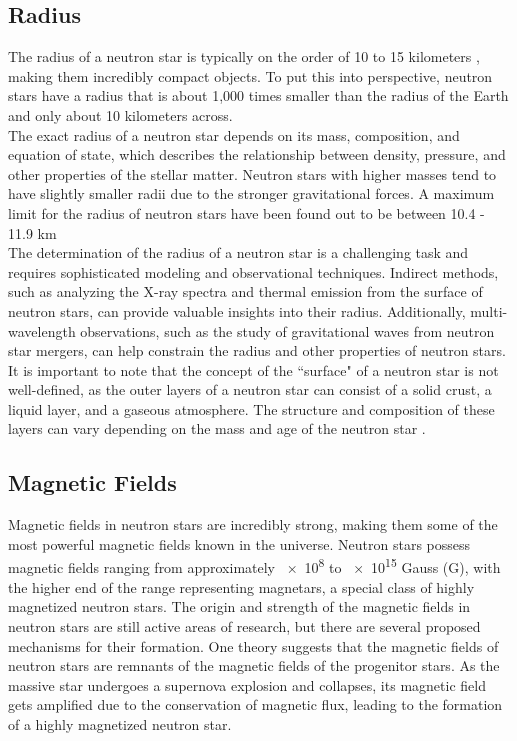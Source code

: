 \subsection{Radius}

The radius of a neutron star is typically on the order of 10 to 15 kilometers , making them incredibly compact objects. To put this into perspective, neutron stars have a radius that is about 1,000 times smaller than the radius of the Earth and only about 10 kilometers across.\\

The exact radius of a neutron star depends on its mass, composition, and equation of state, which describes the relationship between density, pressure, and other properties of the stellar matter. Neutron stars with higher masses tend to have slightly smaller radii due to the stronger gravitational forces. A maximum limit for the radius of neutron stars have been found out to be between 10.4 - 11.9 km \\

The determination of the radius of a neutron star is a challenging task and requires sophisticated modeling and observational techniques. Indirect methods, such as analyzing the X-ray spectra and thermal emission from the surface of neutron stars, can provide valuable insights into their radius. Additionally, multi-wavelength observations, such as the study of gravitational waves from neutron star mergers, can help constrain the radius and other properties of neutron stars.\\

It is important to note that the concept of the ``surface" of a neutron star is not well-defined, as the outer layers of a neutron star can consist of a solid crust, a liquid layer, and a gaseous atmosphere. The structure and composition of these layers can vary depending on the mass and age of the neutron star .\\

\subsection{Magnetic Fields}

Magnetic fields in neutron stars are incredibly strong, making them some of the most powerful magnetic fields known in the universe. Neutron stars possess magnetic fields ranging from approximately \num{e8} to \num{e15} Gauss (G), with the higher end of the range representing magnetars, a special class of highly magnetized neutron stars. The origin and strength of the magnetic fields in neutron stars are still active areas of research, but there are several proposed mechanisms for their formation. One theory suggests that the magnetic fields of neutron stars are remnants of the magnetic fields of the progenitor stars. As the massive star undergoes a supernova explosion and collapses, its magnetic field gets amplified due to the conservation of magnetic flux, leading to the formation of a highly magnetized neutron star.

